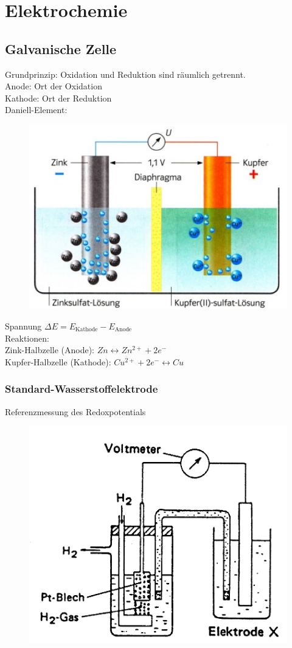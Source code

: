 \section{Elektrochemie}

\subsection{Galvanische Zelle}
Grundprinzip: Oxidation und Reduktion sind räumlich getrennt. \\
Anode: Ort der Oxidation \\
Kathode: Ort der Reduktion \\

Daniell-Element:
\begin{figure}[htbp!]
	\centering
	\includegraphics[width=0.7\linewidth]{images/10_Daniell_Element.png}
\end{figure}

Spannung $\Delta E = E_\text{Kathode}-E_\text{Anode}$ \\

Reaktionen:\\
Zink-Halbzelle (Anode): $Zn \leftrightarrow Zn^{2+} + 2 e^-$ \\
Kupfer-Halbzelle (Kathode): $Cu^{2+} + 2 e^- \leftrightarrow Cu$ \\

\subsubsection{Standard-Wasserstoffelektrode}
Referenzmessung des Redoxpotentials

\begin{figure}[htbp!]
	\centering
	\includegraphics[width=0.6\linewidth]{images/10_Wasserstoffelektrode.png}
\end{figure}

